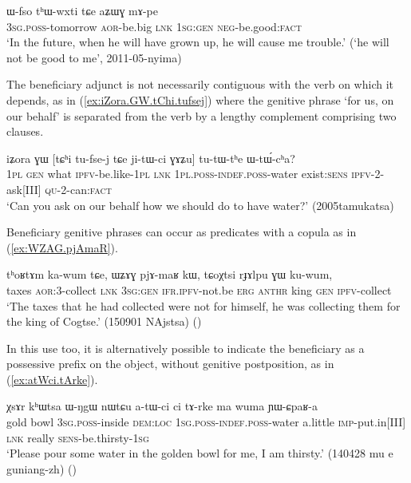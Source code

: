 \begin{exe}
\ex \label{ex:aZWG.mApe}
\gll  ɯ-fso tʰɯ-wxti tɕe aʑɯɣ mɤ-pe \\ 
\textsc{3sg}.\textsc{poss}-tomorrow \textsc{aor}-be.big \textsc{lnk} \textsc{1sg}:\textsc{gen} \textsc{neg}-be.good:\textsc{fact} \\
\glt `In the future, when he will have grown up, he will cause me trouble.' (`he will not be good to me', 2011-05-nyima)
\end{exe}

The beneficiary adjunct is not necessarily contiguous with the verb on which it depends, as in (\ref{ex:iZora.GW.tChi.tufsej}) where the genitive phrase  `for us, on our behalf'  is separated from the verb  by a lengthy complement comprising two clauses.

\begin{exe}
\ex \label{ex:iZora.GW.tChi.tufsej}
\gll  iʑora ɣɯ [tɕʰi tu-fse-j tɕe ji-tɯ-ci ɣɤʑu] tu-tɯ-tʰe ɯ-tɯ́-cʰa? \\
\textsc{1pl} \textsc{gen} what \textsc{ipfv}-be.like-\textsc{1pl} \textsc{lnk} \textsc{1pl}.\textsc{poss}-\textsc{indef}.\textsc{poss}-water exist:\textsc{sens} \textsc{ipfv}-2-ask[III] \textsc{qu}-2-can:\textsc{fact} \\
\glt `Can you ask on our behalf how we should do to have water?' (2005tamukatsa)
\end{exe}

Beneficiary genitive phrases can occur as predicates with a copula as  in (\ref{ex:WZAG.pjAmaR}).

 \begin{exe}
\ex \label{ex:WZAG.pjAmaR}
\gll   tʰoʁtɤm ka-wum tɕe, ɯʑɤɣ pjɤ-maʁ kɯ, tɕoχtsi rɟɤlpu ɣɯ ku-wum,  \\
taxes \textsc{aor}:3\flobv{}-collect \textsc{lnk} \textsc{3sg}:\textsc{gen} \textsc{ifr}.\textsc{ipfv}-not.be \textsc{erg}  \textsc{anthr} king \textsc{gen} \textsc{ipfv}-collect \\
\glt `The taxes that he had collected were not for himself, he was collecting them for the king of Cogtse.' (150901 NAjstsa)
()
\end{exe}

In this use too, it is alternatively possible to indicate the beneficiary as a possessive prefix on the object, without genitive postposition, as in (\ref{ex:atWci.tArke}).

 \begin{exe}
\ex \label{ex:atWci.tArke}
\gll   χsɤr kʰɯtsa ɯ-ŋgɯ nɯtɕu a-tɯ-ci ci tɤ-rke ma wuma ɲɯ-ɕpaʁ-a \\
gold bowl \textsc{3sg}.\textsc{poss}-inside \textsc{dem}:\textsc{loc} \textsc{1sg}.\textsc{poss}-\textsc{indef}.\textsc{poss}-water a.little \textsc{imp}-put.in[III] \textsc{lnk} really \textsc{sens}-be.thirsty-\textsc{1sg} \\
\glt  `Please pour some water in the golden bowl for me, I am thirsty.' (140428 mu e guniang-zh)
()
\end{exe}

